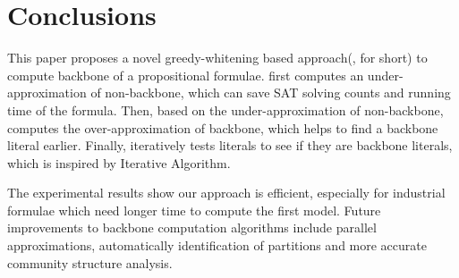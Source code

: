 \section{Conclusions}\label{sec:conc}
This paper proposes a novel greedy-whitening based approach(\tool, for short) to compute backbone of a propositional formulae. 
\tool first computes an under-approximation of non-backbone, which can save SAT solving counts and running time of the formula.
Then, based on the under-approximation of non-backbone, \tool computes the over-approximation of backbone, which helps \tool to find a backbone literal earlier.
Finally, \tool iteratively tests literals to see if they are backbone literals, which is inspired by Iterative Algorithm. 

The experimental results show our approach is efficient, especially for industrial formulae which need longer time to compute the first model.
Future improvements to backbone computation algorithms include parallel approximations, automatically identification of partitions and more accurate community structure analysis.



\newpage

